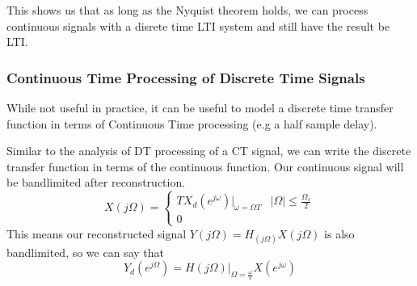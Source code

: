 \documentclass{article}
\begin{document}
This shows us that as long as the Nyquist theorem holds, we can process continuous signals
with a disrete time LTI system and still have the result be LTI.
\subsubsection{Continuous Time Processing of Discrete Time Signals}
While not useful in practice, it can be useful to model a discrete time transfer function in terms of Continuous Time processing (e.g a half sample delay).
\begin{figure}[H]
  \centering
\end{figure}
Similar to the analysis of DT processing of a CT signal, we can write the discrete transfer function in terms of the continuous function.
Our continuous signal will be bandlimited after reconstruction.
\[
  X(j\Omega) = \begin{cases}
    T X_d(e^{j\omega})|_{\omega=\Omega T} & |\Omega| \le \frac{\Omega_s}{2}\\
    0
  \end{cases}
\]
This means our reconstructed signal $Y(j\Omega)=H_(j\Omega)X(j\Omega)$ is also bandlimited, so we can say that
$$Y_d(e^{j\Omega})=H(j\Omega)|_{\Omega=\frac{\omega}{T}}X(e^{j\omega})$$
\end{document}
